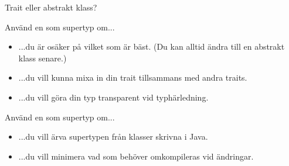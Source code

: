\begin{Slide}{Trait eller abstrakt klass?}
\SlideFontSmall
\label{slideW07:traitorclass}
\begin{multicols}{2}
\noindent Använd en  som supertyp om...
\begin{itemize}
\item ...du är osäker på vilket som är bäst. (Du kan alltid ändra till en abstrakt klass senare.)
\item ...du vill kunna mixa in din trait tillsammans med andra traits.
\item ...du vill göra din typ transparent vid typhärledning.

\end{itemize}

\columnbreak

\noindent Använd en  som supertyp om...
\begin{itemize}
\item ...du vill ärva supertypen från klasser skrivna i Java.
\item ...du vill minimera vad som behöver omkompileras vid ändringar.
\end{itemize}


\end{multicols}
\end{Slide}







